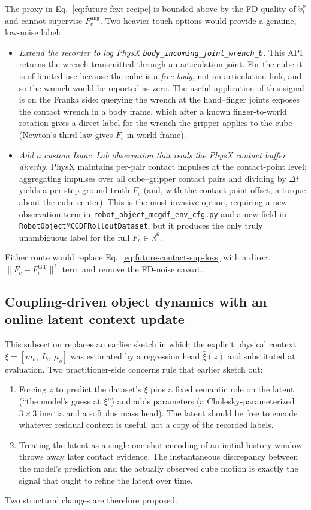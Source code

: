 \documentclass[11pt]{article}
\begin{document}
The proxy in Eq.~\eqref{eq:future-fext-recipe} is bounded above by the FD
quality of $\dot v^o_t$ and cannot supervise $F_c^{\mathrm{ang}}$. Two
heavier-touch options would provide a genuine, low-noise label:
\begin{itemize}
  \item \emph{Extend the recorder to log PhysX
    \texttt{body\_incoming\_joint\_wrench\_b}.} This API returns the
    wrench transmitted through an articulation joint. For the cube it is
    of limited use because the cube is a \emph{free body}, not an
    articulation link, and so the wrench would be reported as zero. The
    useful application of this signal is on the Franka side: querying
    the wrench at the hand--finger joints exposes the contact wrench in
    a body frame, which after a known finger-to-world rotation gives a
    direct label for the wrench the gripper applies to the cube
    (Newton's third law gives $F_c$ in world frame).
  \item \emph{Add a custom Isaac~Lab observation that reads the PhysX
    contact buffer directly.} PhysX maintains per-pair contact impulses
    at the contact-point level; aggregating impulses over all
    cube--gripper contact pairs and dividing by $\Delta t$ yields a
    per-step ground-truth $F_c$ (and, with the contact-point offset,
    a torque about the cube center). This is the most invasive option,
    requiring a new observation term in
    \texttt{robot\_object\_mcgdf\_env\_cfg.py} and a new field in
    \texttt{RobotObjectMCGDFRolloutDataset}, but it produces the only
    truly unambiguous label for the full $F_c \in \mathbb{R}^6$.
\end{itemize}
Either route would replace Eq.~\eqref{eq:future-contact-sup-loss} with a
direct $\|F_c - F_c^{\mathrm{GT}}\|^2$ term and remove the FD-noise
caveat.

\subsection{Coupling-driven object dynamics with an online latent context update}
\label{sec:future-eval-no-gt-context}

This subsection replaces an earlier sketch in which the explicit
physical context $\xi = [m_o,\ I_b,\ \mu_o]$ was estimated by a
regression head $\hat\xi(z)$ and substituted at evaluation. Two
practitioner-side concerns rule that earlier sketch out:
\begin{enumerate}
  \item Forcing $z$ to predict the dataset's $\xi$ pins a fixed semantic
    role on the latent (``the model's guess at $\xi$'') and adds
    parameters (a Cholesky-parameterized $3\times 3$ inertia and a
    softplus mass head). The latent should be free to encode whatever
    residual context is useful, not a copy of the recorded labels.
  \item Treating the latent as a single one-shot encoding of an initial
    history window throws away later contact evidence. The
    instantaneous discrepancy between the model's prediction and the
    actually observed cube motion is exactly the signal that ought to
    refine the latent over time.
\end{enumerate}
Two structural changes are therefore proposed.
\end{document}
